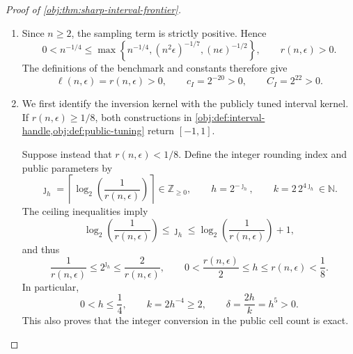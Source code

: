 \begin{proof}[Proof of \cref{obj:thm:sharp-interval-frontier}]
\begin{enumerate}
\item Since \(n\ge2\), the sampling term is strictly positive. Hence
\[
0<n^{-1/4}
\le
\max\left\{
n^{-1/4},(n^2\epsilon)^{-1/7},(n\epsilon)^{-1/2}
\right\},
\qquad
r(n,\epsilon)>0.
\]
The definitions of the benchmark and constants therefore give
\[
\ell(n,\epsilon)=r(n,\epsilon)>0,
\qquad
c_I=2^{-20}>0,
\qquad
C_I=2^{22}>0.
\]

\item We first identify the inversion kernel with the publicly tuned interval kernel. If \(r(n,\epsilon)\ge1/8\), both constructions in
\cref{obj:def:interval-handle,obj:def:public-tuning} return \([-1,1]\).

Suppose instead that \(r(n,\epsilon)<1/8\). Define the integer rounding index and public parameters by
\[
\jmath_h
=
\left\lceil\log_2\!\left(\frac1{r(n,\epsilon)}\right)\right\rceil
\in\mathbb Z_{\ge0},
\qquad
h=2^{-\jmath_h},
\qquad
k=2\,2^{4\jmath_h}\in\mathbb N.
\]
The ceiling inequalities imply
\[
\log_2\!\left(\frac1{r(n,\epsilon)}\right)
\le\jmath_h
\le
\log_2\!\left(\frac1{r(n,\epsilon)}\right)+1,
\]
and thus
\[
\frac1{r(n,\epsilon)}
\le2^{\jmath_h}
\le\frac2{r(n,\epsilon)},
\qquad
0<\frac{r(n,\epsilon)}2\le h\le r(n,\epsilon)<\frac18.
\]
In particular,
\[
0<h\le\frac14,
\qquad
k=2h^{-4}\ge2,
\qquad
\delta=\frac{2h}{k}=h^5>0.
\]
This also proves that the integer conversion in the public cell count is exact.


\end{enumerate}
\end{proof}
